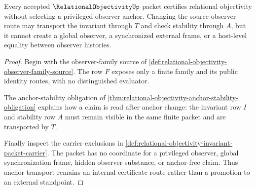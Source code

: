 \begin{theorem}
\label{thm:relational-objectivity-no-privileged-anchor-certificate}
Every accepted $\RelationalObjectivityUp$ packet certifies relational objectivity without selecting a privileged observer anchor. Changing the source observer route may transport the invariant through $T$ and check stability through $A$, but it cannot create a global observer, a synchronized external frame, or a host-level equality between observer histories.
\end{theorem}
\begin{proof}
Begin with the observer-family source of \autoref{def:relational-objectivity-observer-family-source}. The row $F$ exposes only a finite family and its public identity routes, with no distinguished evaluator.

The anchor-stability obligation of \autoref{thm:relational-objectivity-anchor-stability-obligation} explains how a claim is read after anchor change: the invariant row $I$ and stability row $A$ must remain visible in the same finite packet and are transported by $T$.

Finally inspect the carrier exclusions in \autoref{def:relational-objectivity-invariant-packet-carrier}. The packet has no coordinate for a privileged observer, global synchronization frame, hidden observer substance, or anchor-free claim. Thus anchor transport remains an internal certificate route rather than a promotion to an external standpoint.
\end{proof}

